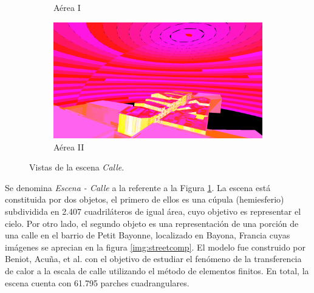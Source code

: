 \begin{figure}[htbp]
\begin{subfigure}{0.45\textwidth}
		\caption{Aérea I}
	\end{subfigure}
	\begin{subfigure}{0.45\textwidth}
		\includegraphics[width=1\linewidth]{assets/street4}
		\caption{Aérea II}
	\end{subfigure}
	\caption{Vistas de la escena \textit{Calle}.}
	\label{img:street}
\end{figure}

Se denomina \textit{Escena - Calle} a la referente a la Figura \ref{img:street}. La escena está constituida por dos objetos, el primero de ellos es una cúpula (hemiesferio) subdividida en 2.407 cuadriláteros de igual área, cuyo objetivo es representar el cielo. Por otro lado, el segundo objeto es una representación de una porción de una calle en el barrio de Petit Bayonne, localizado en Bayona, Francia cuyas imágenes se aprecian en la figura \ref{img:streetcomp}. El modelo fue construido por Beniot, Acuña, et al. \cite{Benoit} con el objetivo de estudiar el fenómeno de la transferencia de calor a la escala de calle utilizando el método de elementos finitos. En total, la escena cuenta con 61.795 parches cuadrangulares.


